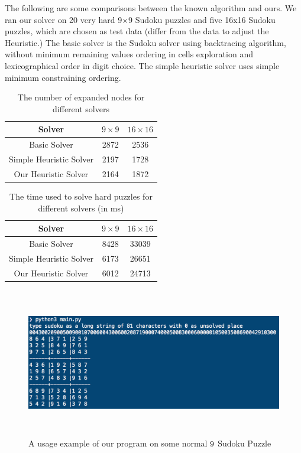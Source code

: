 \documentclass[12pt]{article}
\begin{document}
\begin{spacing}{1.1}
The following are some comparisons between the known algorithm and ours. We ran our solver on 20 very hard  9×9 Sudoku puzzles and five 16x16 Sudoku puzzles, which are chosen as test data (differ from the data to adjust the Heuristic.) The basic solver is the Sudoku solver using backtracing algorithm, without minimum remaining values ordering in cells exploration and lexicographical order in digit choice. The simple heuristic solver uses simple minimum constraining ordering.

\begin{table}[h]
	\centering
\begin{tabular}{|c|c|c|}
	\hline
	Solver & $9\times 9$ & $16\times 16$\\
	\hline
	Basic Solver & 2872 & 2536\\
	\hline
	Simple Heuristic Solver & 2197 & 1728\\
	\hline
	Our Heuristic Solver & 2164 & 1872\\
	\hline
\end{tabular}
\caption{The number of expanded nodes for different solvers}
\end{table}

\begin{table}[h]
	\centering
	\begin{tabular}{|c|c|c|}
		\hline
		Solver & $9\times 9$ & $16\times 16$\\
		\hline
		Basic Solver & 8428 & 33039\\
		\hline
		Simple Heuristic Solver & 6173 & 26651\\
		\hline	
		Our Heuristic Solver & 6012 & 24713\\
		\hline
	\end{tabular}
\caption{The time used to solve hard puzzles for different solvers (in ms)}
\end{table}


\begin{figure}[h!]
\centering
\includegraphics[height=6.5cm]{example}
\caption{A usage example of our program on some normal $9\time9$ Sudoku Puzzle}
\end{figure}


\end{spacing}
\end{document}

